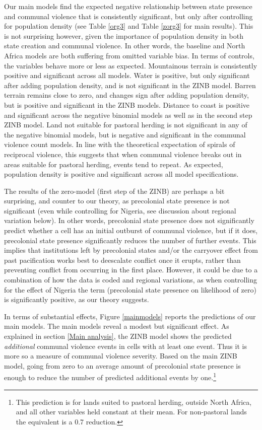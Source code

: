 Our main models find the expected negative relationship between state presence
and communal violence that is consistently significant, but only after
controlling for population density (see Table \ref{org3} and Table \ref{zorg3}
for main results). This is not surprising however, given the importance of
population density in both state creation and communal violence. In other words,
the baseline and North Africa models are both suffering from omitted variable
bias. In terms of controls, the variables behave more or less as expected.
Mountainous terrain is consistently positive and significant across all models.
Water is positive, but only significant after adding population density, and is
not significant in the ZINB model. Barren terrain remains close to zero, and
changes sign after adding population density, but is positive and significant in
the ZINB models. Distance to coast is positive and significant across the
negative binomial models as well as in the second step ZINB model. Land not
suitable for pastoral herding is not significant in any of the negative binomial
models, but is negative and significant in the communal violence count models.
In line with the theoretical expectation of spirals of reciprocal violence, this
suggests that when communal violence breaks out in areas suitable for pastoral
herding, events tend to repeat. As expected, population density is positive and
significant across all model specifications. 

The results of the zero-model (first step of the ZINB) are perhaps a bit
surprising, and counter to our theory, as precolonial state presence is not
significant (even while controlling for Nigeria, see discussion about regional
variation below). In other words, precolonial state presence does not
significantly predict whether a cell has an initial outburst of communal
violence, but if it does, precolonial state presence significantly reduces the
number of further events. This implies that institutions left by precolonial
states and/or the carryover effect from past pacification works best to
deescalate conflict once it erupts, rather than preventing conflict from
occurring in the first place. However, it could be due to a combination of how
the data is coded and regional variations, as when controlling for the effect of
Nigeria the term (precolonial state presence on likelihood of zero) is
significantly positive, as our theory suggests.

In terms of substantial effects, Figure \ref{mainmodels} reports the predictions
of our main models. The main models reveal a modest but significant effect. As
explained in section \ref{Main analysis}, the ZINB model shows the predicted
\textit{additional} communal violence events in cells with at least one event.
Thus it is more so a measure of communal violence severity. Based on the main
ZINB model, going from zero to an average amount of precolonial state presence
is enough to reduce the number of predicted additional events by one.\footnote{
This prediction is for lands suited to pastoral herding, outside North Africa,
and all other variables held constant at their mean. For non-pastoral lands the
equivalent is a 0.7 reduction.}

